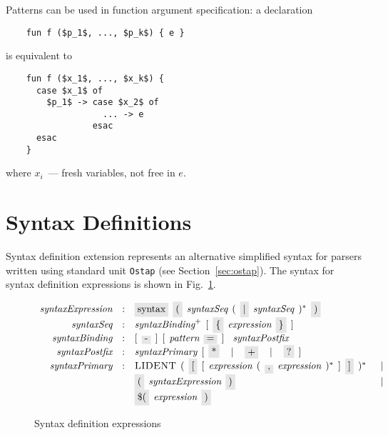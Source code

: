 Patterns can be used in function argument specification: a declaration

\begin{lstlisting}
    fun f ($p_1$, ..., $p_k$) { e }
\end{lstlisting}

is equivalent to

\begin{lstlisting}
    fun f ($x_1$, ..., $x_k$) {
      case $x_1$ of
        $p_1$ -> case $x_2$ of
                   ... -> e
                 esac
      esac
    }
\end{lstlisting}

where $x_i$~--- fresh variables, not free in $e$.

\section{Syntax Definitions}

Syntax definition extension represents an alternative simplified syntax for parsers written using standard unit \lstinline|Ostap| (see Section~\ref{sec:ostap}).
The syntax for syntax definition expressions is shown in Fig.~\ref{syntax_expressions}.

\begin{figure}[h]
  \[
    \begin{array}{rcll}
      \defterm{syntaxExpression}  & : & \term{syntax}\s\term{(}\s\nonterm{syntaxSeq}\s(\s\term{$\mid$}\s\nonterm{syntaxSeq}\s)^*\s\term{)}&\\
      \defterm{syntaxSeq}         & : & \nonterm{syntaxBinding}^+\s[\s\term{\{}\s\nonterm{expression}\s\term{\}}\s]&\\
      \defterm{syntaxBinding}     & : & [\s\term{-}\s]\s[\s\nonterm{pattern}\s\term{=}\s]\s\s\nonterm{syntaxPostfix}&\\
      \defterm{syntaxPostfix}     & : & \nonterm{syntaxPrimary}\s[\s\term{*}\s\alt\s\term{+}\s\alt\s\term{?}\s]&\\
      \defterm{syntaxPrimary}     & : & \token{LIDENT}\s(\s\term{[}\s[\s\nonterm{expression}\s(\s\term{,}\s\nonterm{expression}\s)^*\s]\s\term{]}\s)^*&\alt\\
                                  &   & \term{(}\s\nonterm{syntaxExpression}\s\term{)}&\alt\\
                                  &   & \term{\$(}\s\nonterm{expression}\s\term{)}&
    \end{array}
  \]
  \caption{Syntax definition expressions}
  \label{syntax_expressions}
\end{figure}

